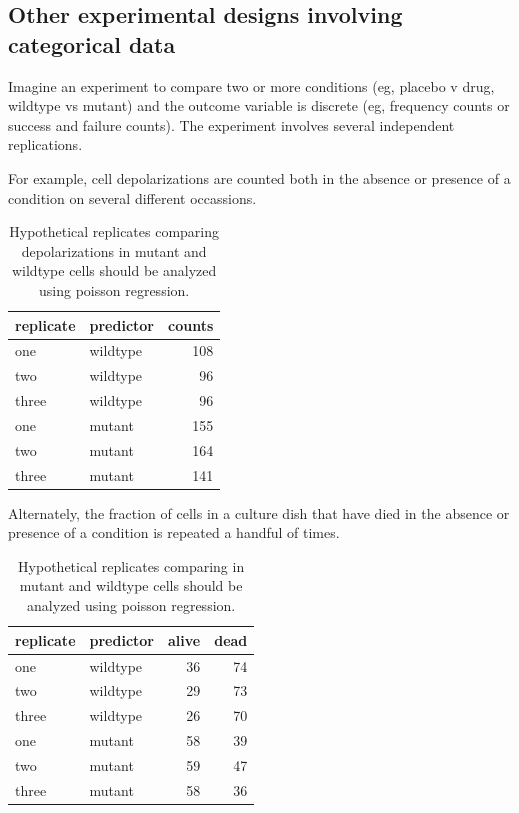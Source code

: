 \documentclass[]{book}
\begin{document}
\hypertarget{other-experimental-designs-involving-categorical-data}{%
\subsection{Other experimental designs involving categorical data}\label{other-experimental-designs-involving-categorical-data}}

Imagine an experiment to compare two or more conditions (eg, placebo v drug, wildtype vs mutant) and the outcome variable is discrete (eg, frequency counts or success and failure counts). The experiment involves several independent replications.

For example, cell depolarizations are counted both in the absence or presence of a condition on several different occassions.

\begin{table}[t]

\caption{\label{tab:unnamed-chunk-43}Hypothetical replicates comparing depolarizations in mutant and wildtype cells should be analyzed using poisson regression.}
\centering
\begin{tabular}{llr}
\toprule
replicate & predictor & counts\\
\midrule
one & wildtype & 108\\
two & wildtype & 96\\
three & wildtype & 96\\
one & mutant & 155\\
two & mutant & 164\\
\addlinespace
three & mutant & 141\\
\bottomrule
\end{tabular}
\end{table}

Alternately, the fraction of cells in a culture dish that have died in the absence or presence of a condition is repeated a handful of times.

\begin{table}[t]

\caption{\label{tab:unnamed-chunk-44}Hypothetical replicates comparing in mutant and wildtype cells should be analyzed using poisson regression.}
\centering
\begin{tabular}{llrr}
\toprule
replicate & predictor & alive & dead\\
\midrule
one & wildtype & 36 & 74\\
two & wildtype & 29 & 73\\
three & wildtype & 26 & 70\\
one & mutant & 58 & 39\\
two & mutant & 59 & 47\\
\addlinespace
three & mutant & 58 & 36\\
\bottomrule
\end{tabular}
\end{table}
\end{document}
